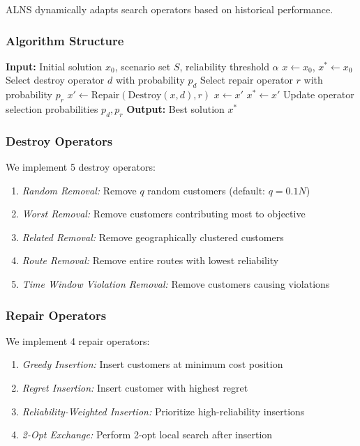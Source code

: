 ALNS \cite{Ropke2006} dynamically adapts search operators based on historical performance.

\subsubsection{Algorithm Structure}

\begin{algorithm}[H]
\caption{Adaptive Large Neighborhood Search for SVRP}
\begin{algorithmic}[1]
\STATE \textbf{Input:} Initial solution $x_0$, scenario set $S$, reliability threshold $\alpha$
\STATE $x \leftarrow x_0$, $x^* \leftarrow x_0$
\STATE Select destroy operator $d$ with probability $p_d$
\STATE Select repair operator $r$ with probability $p_r$
\STATE $x' \leftarrow \text{Repair}(\text{Destroy}(x, d), r)$
\STATE $x \leftarrow x'$
\STATE $x^* \leftarrow x'$
\ENDIF
\ENDIF
\STATE Update operator selection probabilities $p_d, p_r$
\ENDFOR
\STATE \textbf{Output:} Best solution $x^*$
\end{algorithmic}
\end{algorithm}

\subsubsection{Destroy Operators}

We implement 5 destroy operators:
\begin{enumerate}
\item \textit{Random Removal:} Remove $q$ random customers (default: $q = 0.1N$)
\item \textit{Worst Removal:} Remove customers contributing most to objective
\item \textit{Related Removal:} Remove geographically clustered customers
\item \textit{Route Removal:} Remove entire routes with lowest reliability
\item \textit{Time Window Violation Removal:} Remove customers causing violations
\end{enumerate}

\subsubsection{Repair Operators}

We implement 4 repair operators:
\begin{enumerate}
\item \textit{Greedy Insertion:} Insert customers at minimum cost position
\item \textit{Regret Insertion:} Insert customer with highest regret \cite{Potvin1996}
\item \textit{Reliability-Weighted Insertion:} Prioritize high-reliability insertions
\item \textit{2-Opt Exchange:} Perform 2-opt local search after insertion
\end{enumerate}

